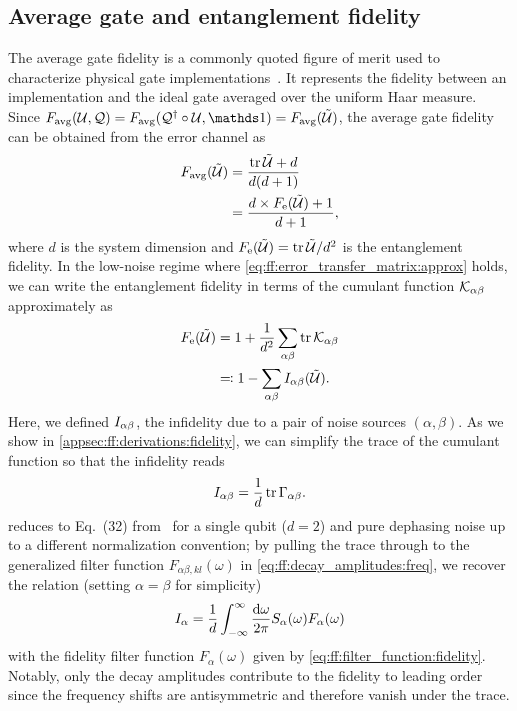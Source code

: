 \subsection{Average gate and entanglement fidelity}\label{sec:ff:theory:derived_quantities:entanglement_fidelity}
The average gate fidelity is a commonly quoted figure of merit used to characterize physical gate implementations~\cite{Loss1998,Ladd2010,Chow2012,Veldhorst2014,Yoneda2018}.
It represents the fidelity between an implementation \liouvU and the ideal gate \liouvQ averaged over the uniform Haar measure.
Since $\avgfid(\liouvU, \liouvQ) = \avgfid(\liouvQ\adjoint\circ\liouvU, \eye) = \avgfid(\liouvUe)$, the average gate fidelity can be obtained from the error channel \liouvUe as~\cite{Horodecki1999,Nielsen2002}
\begin{align}
    F_{\mathrm{avg}}(\mathcal{\tilde{U}}) &= \frac{\tr\mathcal{\tilde{U}} + d}{d(d+1)} \label{eq:ff:fidelity:avg}\\
                      &= \frac{d\times F_{\mathrm{e}}(\mathcal{\tilde{U}}) + 1}{d + 1}, \label{eq:ff:fidelity:avg-ent}
\end{align}
where $d$ is the system dimension and $F_{\mathrm{e}}(\mathcal{\tilde{U}}) = \tr\mathcal{\tilde{U}} / d^2$ is the entanglement fidelity.
In the low-noise regime where \cref{eq:ff:error_transfer_matrix:approx} holds, we can write the entanglement fidelity in terms of the cumulant function $\mathcal{K}_{\alpha\beta}$ approximately as
\begin{align}\label{eq:ff:fidelity:ent}
    F_{\mathrm{e}}(\mathcal{\tilde{U}}) &= 1 + \frac{1}{d^2}\sum_{\alpha\beta}\tr\mathcal{K}_{\alpha\beta} \\
                      &\eqqcolon 1 - \sum_{\alpha\beta}I_{\alpha\beta}(\mathcal{\tilde{U}}).
\end{align}
Here, we defined $I_{\alpha\beta}$, the infidelity due to a pair of noise sources $(\alpha,\beta)$.
As we show in \cref{appsec:ff:derivations:fidelity}, we can simplify the trace of the cumulant function so that the infidelity reads
\begin{equation}\label{eq:ff:infidelity:ent}
    I_{\alpha\beta} = \frac{1}{d}\tr\Gamma_{\alpha\beta}.
\end{equation}
 reduces to Eq.~(32) from~ for a single qubit ($d=2$) and pure dephasing noise up to a different normalization convention; by pulling the trace through to the generalized filter function $F_{\alpha\beta,kl}(\omega)$ in \cref{eq:ff:decay_amplitudes:freq}, we recover the relation (setting $\alpha=\beta$ for simplicity)
\begin{equation}\label{eq:ff:infidelity:ent:integral}
    I_{\alpha} = \frac{1}{d}\int_{-\infty}^\infty\frac{\dd{\omega}}{2\pi} S_{\alpha}(\omega) F_{\alpha}(\omega)
\end{equation}
with the fidelity filter function $F_{\alpha}(\omega)$ given by \cref{eq:ff:filter_function:fidelity}.
Notably, only the decay amplitudes \decayamps contribute to the fidelity to leading order since the frequency shifts \freqshifts are antisymmetric and therefore vanish under the trace.


